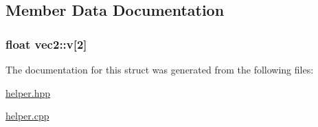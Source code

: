 \subsection{Member Data Documentation}
\hypertarget{structvec2_ae25758a321e69cf6f722589fca155735}{
\subsubsection[{v}]{\setlength{\rightskip}{0pt plus 5cm}float vec2\+::v\mbox{[}2\mbox{]}}}\label{structvec2_ae25758a321e69cf6f722589fca155735}


The documentation for this struct was generated from the following files\+:\begin{DoxyCompactItemize}
\item 
\hyperlink{helper_8hpp}{helper.\+hpp}\item 
\hyperlink{helper_8cpp}{helper.\+cpp}\end{DoxyCompactItemize}
